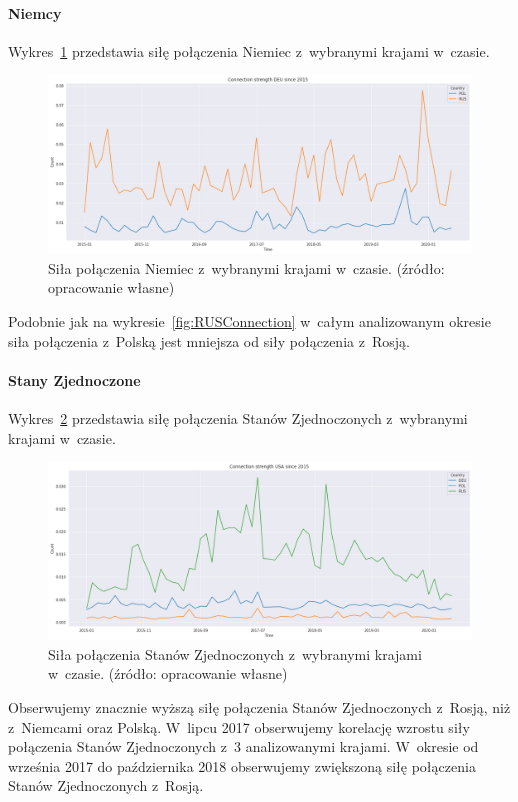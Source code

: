 \documentclass[11pt]{report}
\begin{document}
    \paragraph{Niemcy}

    Wykres~\ref{fig:DEUConnection} przedstawia siłę połączenia Niemiec z~wybranymi krajami w~czasie.
    \begin{figure}[!htp]
        \centering
        \includegraphics[width=\linewidth]{fig/DEU/DEUConnection.png}
        \caption{Siła połączenia Niemiec z~wybranymi krajami w~czasie. (źródło: opracowanie własne)}
        \label{fig:DEUConnection}
    \end{figure}
    Podobnie jak na wykresie~\ref{fig:RUSConnection} w~całym analizowanym okresie siła połączenia z~Polską jest mniejsza od siły połączenia z~Rosją.

    \paragraph{Stany Zjednoczone}

    Wykres~\ref{fig:USAConnection} przedstawia siłę połączenia Stanów Zjednoczonych z~wybranymi krajami w~czasie.

    \begin{figure}[!htp]
        \centering
        \includegraphics[width=\linewidth]{fig/USA/USAConnection.png}
        \caption{Siła połączenia Stanów Zjednoczonych z~wybranymi krajami w~czasie. (źródło: opracowanie własne)}
        \label{fig:USAConnection}
    \end{figure}
    Obserwujemy znacznie wyższą siłę połączenia Stanów Zjednoczonych z~Rosją, niż z~Niemcami oraz Polską.
    W~lipcu 2017 obserwujemy korelację wzrostu siły połączenia Stanów Zjednoczonych z~3 analizowanymi krajami.
    W~okresie od września 2017 do października 2018 obserwujemy zwiększoną siłę połączenia Stanów Zjednoczonych z~Rosją.
\end{document}
